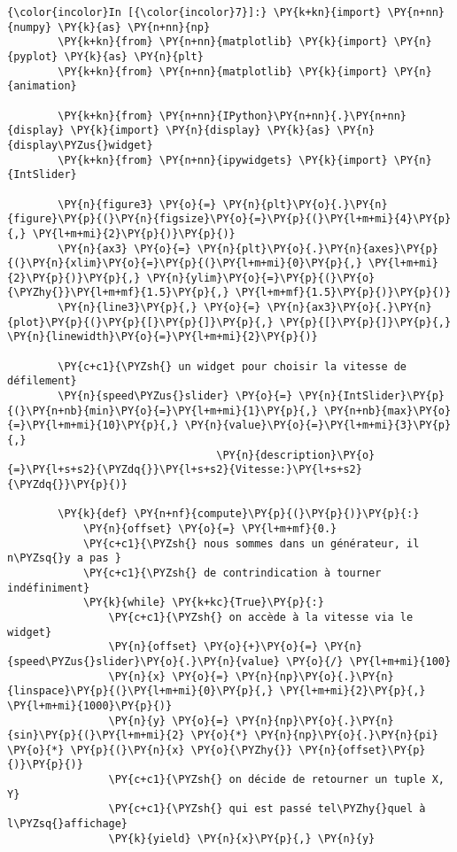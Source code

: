     \begin{Verbatim}[commandchars=\\\{\},frame=single,framerule=0.3mm,rulecolor=\color{cellframecolor}]
{\color{incolor}In [{\color{incolor}7}]:} \PY{k+kn}{import} \PY{n+nn}{numpy} \PY{k}{as} \PY{n+nn}{np}
        \PY{k+kn}{from} \PY{n+nn}{matplotlib} \PY{k}{import} \PY{n}{pyplot} \PY{k}{as} \PY{n}{plt}
        \PY{k+kn}{from} \PY{n+nn}{matplotlib} \PY{k}{import} \PY{n}{animation}
        
        \PY{k+kn}{from} \PY{n+nn}{IPython}\PY{n+nn}{.}\PY{n+nn}{display} \PY{k}{import} \PY{n}{display} \PY{k}{as} \PY{n}{display\PYZus{}widget}
        \PY{k+kn}{from} \PY{n+nn}{ipywidgets} \PY{k}{import} \PY{n}{IntSlider}
        
        \PY{n}{figure3} \PY{o}{=} \PY{n}{plt}\PY{o}{.}\PY{n}{figure}\PY{p}{(}\PY{n}{figsize}\PY{o}{=}\PY{p}{(}\PY{l+m+mi}{4}\PY{p}{,} \PY{l+m+mi}{2}\PY{p}{)}\PY{p}{)}
        \PY{n}{ax3} \PY{o}{=} \PY{n}{plt}\PY{o}{.}\PY{n}{axes}\PY{p}{(}\PY{n}{xlim}\PY{o}{=}\PY{p}{(}\PY{l+m+mi}{0}\PY{p}{,} \PY{l+m+mi}{2}\PY{p}{)}\PY{p}{,} \PY{n}{ylim}\PY{o}{=}\PY{p}{(}\PY{o}{\PYZhy{}}\PY{l+m+mf}{1.5}\PY{p}{,} \PY{l+m+mf}{1.5}\PY{p}{)}\PY{p}{)}
        \PY{n}{line3}\PY{p}{,} \PY{o}{=} \PY{n}{ax3}\PY{o}{.}\PY{n}{plot}\PY{p}{(}\PY{p}{[}\PY{p}{]}\PY{p}{,} \PY{p}{[}\PY{p}{]}\PY{p}{,} \PY{n}{linewidth}\PY{o}{=}\PY{l+m+mi}{2}\PY{p}{)}
        
        \PY{c+c1}{\PYZsh{} un widget pour choisir la vitesse de défilement}
        \PY{n}{speed\PYZus{}slider} \PY{o}{=} \PY{n}{IntSlider}\PY{p}{(}\PY{n+nb}{min}\PY{o}{=}\PY{l+m+mi}{1}\PY{p}{,} \PY{n+nb}{max}\PY{o}{=}\PY{l+m+mi}{10}\PY{p}{,} \PY{n}{value}\PY{o}{=}\PY{l+m+mi}{3}\PY{p}{,}
                                 \PY{n}{description}\PY{o}{=}\PY{l+s+s2}{\PYZdq{}}\PY{l+s+s2}{Vitesse:}\PY{l+s+s2}{\PYZdq{}}\PY{p}{)}
        
        \PY{k}{def} \PY{n+nf}{compute}\PY{p}{(}\PY{p}{)}\PY{p}{:}
            \PY{n}{offset} \PY{o}{=} \PY{l+m+mf}{0.}
            \PY{c+c1}{\PYZsh{} nous sommes dans un générateur, il n\PYZsq{}y a pas }
            \PY{c+c1}{\PYZsh{} de contrindication à tourner indéfiniment}
            \PY{k}{while} \PY{k+kc}{True}\PY{p}{:}
                \PY{c+c1}{\PYZsh{} on accède à la vitesse via le widget}
                \PY{n}{offset} \PY{o}{+}\PY{o}{=} \PY{n}{speed\PYZus{}slider}\PY{o}{.}\PY{n}{value} \PY{o}{/} \PY{l+m+mi}{100}
                \PY{n}{x} \PY{o}{=} \PY{n}{np}\PY{o}{.}\PY{n}{linspace}\PY{p}{(}\PY{l+m+mi}{0}\PY{p}{,} \PY{l+m+mi}{2}\PY{p}{,} \PY{l+m+mi}{1000}\PY{p}{)}
                \PY{n}{y} \PY{o}{=} \PY{n}{np}\PY{o}{.}\PY{n}{sin}\PY{p}{(}\PY{l+m+mi}{2} \PY{o}{*} \PY{n}{np}\PY{o}{.}\PY{n}{pi} \PY{o}{*} \PY{p}{(}\PY{n}{x} \PY{o}{\PYZhy{}} \PY{n}{offset}\PY{p}{)}\PY{p}{)}
                \PY{c+c1}{\PYZsh{} on décide de retourner un tuple X, Y}
                \PY{c+c1}{\PYZsh{} qui est passé tel\PYZhy{}quel à l\PYZsq{}affichage}
                \PY{k}{yield} \PY{n}{x}\PY{p}{,} \PY{n}{y} 
        

\end{Verbatim}
